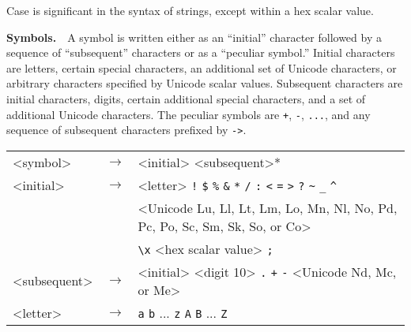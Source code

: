 Case is significant in the syntax of strings, except within a hex scalar value.


\textbf{Symbols\label{grammar_grammar_symbols}.}  \label{grammar_s17}A symbol is written either as an ``initial'' character followed by a sequence of
``subsequent'' characters or as a ``peculiar symbol.''
Initial characters are letters, certain special characters, an additional
set of Unicode characters, or arbitrary characters specified by Unicode
scalar values.
Subsequent characters are initial characters, digits, certain additional
special characters, and a set of additional Unicode characters.
The peculiar symbols are \texttt{+}, \texttt{-}, \texttt{...}, and any
sequence of subsequent characters prefixed by \texttt{-\textgreater{}}.


  
  
  {\footnotesize
\begin{tabular}[H]{lcl}

\textless{}symbol\textgreater{} & \(\longrightarrow\) & \textless{}initial\textgreater{} \textless{}subsequent\textgreater{}* \\

\textless{}initial\textgreater{} & \(\longrightarrow\) & \textless{}letter\textgreater{} \textbar{} \texttt{!} \textbar{} \texttt{\${}} \textbar{} \texttt{\%{}}
    \textbar{} \texttt{\&{}} \textbar{} \texttt{*} \textbar{} \texttt{/} \textbar{} \texttt{:}
    \textbar{} \texttt{\textless{}} \textbar{} \texttt{=} \textbar{} \texttt{\textgreater{}} \textbar{} \texttt{?}
    \textbar{} \texttt{\~{}} \textbar{} \texttt{\_{}} \textbar{} \texttt{\^{}} \\

   & \textbar{} & \textless{}Unicode Lu, Ll, Lt, Lm, Lo, Mn, Nl, No, Pd, Pc, Po, Sc, Sm, Sk, So, or Co\textgreater{} \\

   & \textbar{} & \texttt{\textbackslash{}x} \textless{}hex scalar value\textgreater{} \texttt{;} \\

\textless{}subsequent\textgreater{} & \(\longrightarrow\) & \textless{}initial\textgreater{} \textbar{} \textless{}digit 10\textgreater{} \textbar{} \texttt{.}
    \textbar{} \texttt{+} \textbar{} \texttt{-} \textbar{} \texttt{\@{}} \textbar{} \textless{}Unicode Nd, Mc, or Me\textgreater{} \\

\textless{}letter\textgreater{} & \(\longrightarrow\) & \texttt{a} \textbar{} \texttt{b} \textbar{} ... \textbar{} \texttt{z}
              \textbar{} \texttt{A} \textbar{} \texttt{B} \textbar{} ... \textbar{} \texttt{Z}
 \\
\end{tabular}
}


